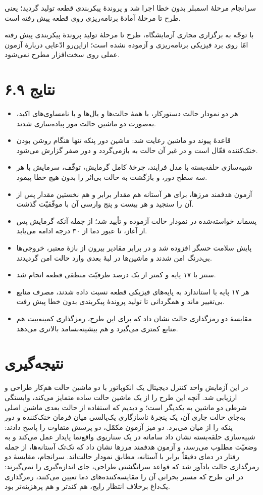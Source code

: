 \documentclass[12pt,a4paper]{article}
\begin{document}
	سرانجام مرحلهٔ اسمبلر بدون خطا اجرا شد و پروندهٔ پیکربندی قطعه تولید گردید؛ یعنی طرح تا مرحلهٔ آمادهٔ برنامه‌ریزی روی قطعه پیش رفته است.

	با توجّه به برگزاری مجازی آزمایشگاه، طرح تا مرحلهٔ تولید پروندهٔ پیکربندی پیش رفته امّا روی برد فیزیکی برنامه‌ریزی و آزموده نشده است؛ ازاین‌رو ادّعایی دربارهٔ آزمون عملی روی سخت‌افزار مطرح نمی‌شود.

	\section*{۶.۹ نتایج}
	\begin{itemize}
		\item هر دو نمودار حالت دستورکار، با همهٔ حالت‌ها و یال‌ها و با نامساوی‌های اکید، به‌صورت دو ماشین حالت مور پیاده‌سازی شدند.
		\item قاعدهٔ پیوند دو ماشین رعایت شد: ماشین دور پنکه تنها هنگام روشن بودن خنک‌کننده فعّال است و در غیر آن حالت به  بازمی‌گردد و دور صفر گزارش می‌شود.
		\item شبیه‌سازی حلقه‌بسته با مدل فرایند، چرخهٔ کامل گرمایش، توقّف، سرمایش با هر سه سطح دور، و بازگشت به حالت بی‌اثر را بدون هیچ خطا پیمود.
		\item آزمون هدفمند مرزها، برای هر آستانه هم مقدار برابر و هم نخستین مقدار پس از آن را سنجید و هر بیست و پنج وارسی آن با موفّقیّت گذشت.
		\item پسماند خواسته‌شده در نمودار حالت آزموده و تأیید شد؛ از جمله آنکه گرمایش پس از آغاز، تا عبور دما از ۳۰ درجه ادامه می‌یابد.
		\item پایش سلامت حسگر افزوده شد و در برابر مقادیر بیرون از بازهٔ معتبر، خروجی‌ها بی‌درنگ امن شدند و ماشین‌ها در لبهٔ بعدی وارد حالت امن گردیدند.
		\item سنتز با ۱۷ پایه و کمتر از یک درصد ظرفیّت منطقی قطعه انجام شد.
		\item هر ۱۷ پایه با استاندارد  به پایه‌های فیزیکی قطعه نسبت داده شدند، مصرف منابع بی‌تغییر ماند و همگردانی تا تولید پروندهٔ پیکربندی بدون خطا پیش رفت.
		\item مقایسهٔ دو رمزگذاری حالت نشان داد که برای این طرح، رمزگذاری کمینه‌بیت هم منابع کمتری می‌گیرد و هم بیشینه‌بسامد بالاتری می‌دهد.
	\end{itemize}

	\section*{نتیجه‌گیری}
	در این آزمایش واحد کنترل دیجیتال یک انکوباتور با دو ماشین حالت هم‌کار طراحی و ارزیابی شد. آنچه این طرح را از یک ماشین حالت ساده متمایز می‌کند، وابستگی شرطی دو ماشین به یکدیگر است؛ و دیدیم که استفاده از حالت بعدی ماشین اصلی به‌جای حالت جاری آن، یک پنجرهٔ ناسازگاری یک‌پالسی میان فرمان خنک‌کننده و دور پنکه را از میان می‌برد. دو میز آزمون مکمّل، دو پرسش متفاوت را پاسخ دادند: شبیه‌سازی حلقه‌بسته نشان داد سامانه در یک سناریوی واقع‌نما پایدار عمل می‌کند و به وضعیّت مطلوب می‌رسد، و آزمون هدفمند مرزها نشان داد که تک‌تک آستانه‌ها، از جمله رفتار در دمای دقیقاً برابر با آستانه، مطابق نمودار حالت‌اند. سرانجام، مقایسهٔ دو رمزگذاری حالت یادآور شد که قواعد سرانگشتی طراحی، جای اندازه‌گیری را نمی‌گیرند: در این طرح که مسیر بحرانی آن را مقایسه‌کننده‌های دما تعیین می‌کنند، رمزگذاری یک‌داغ برخلاف انتظار رایج، هم کندتر و هم پرهزینه‌تر بود.
\end{document}
